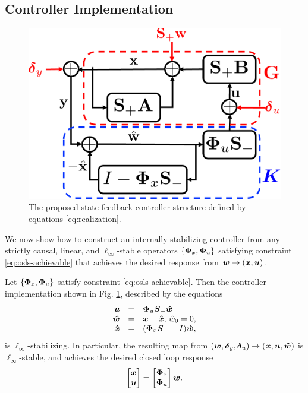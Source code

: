 \subsection{Controller Implementation}
\begin{figure}
\centering
\includegraphics[width=.35\textwidth]{interconnect}
\caption{The proposed state-feedback controller structure defined by equations \eqref{eq:realization}.}
\label{fig:realization}
\end{figure}
We now show how to construct an internally stabilizing controller from any strictly causal, linear, and $\ell_\infty$-stable operators $\left \{\boldsymbol{\Phi}_x,\boldsymbol{\Phi}_u\right\}$ satisfying constraint \eqref{eq:osls-achievable} that achieves the desired response from $\boldsymbol{w} \to (\boldsymbol{x}, \boldsymbol{u})$.
\begin{proposition}\label{prop:sufficiency}
Let $\left\{\boldsymbol{\Phi}_x,\boldsymbol{\Phi}_u\right\}$ satisfy constraint \eqref{eq:osls-achievable}.  Then the controller implementation shown in Fig. \ref{fig:realization}, described by the equations
\begin{equation}
\begin{array}{rcl}
\boldsymbol{u} &=& \boldsymbol{\Phi}_u \boldsymbol{S}_- \boldsymbol{\hat w}\\
\boldsymbol{\hat w} & = & \boldsymbol{x} - \boldsymbol{\hat x}, \, \hat{w}_0 = 0, \\
\boldsymbol{\hat x} &=& (\boldsymbol{\Phi}_x\boldsymbol{S}_--I)\boldsymbol{\hat w},
\end{array}
\label{eq:realization}
\end{equation}
is $\ell_\infty$-stabilizing.  In particular, the resulting map from $(\boldsymbol{w}, \boldsymbol{\delta}_y, \boldsymbol{\delta}_u) \to (\boldsymbol{x}, \boldsymbol{u}, \boldsymbol{\hat w})$ is $\ell_\infty$-stable, and achieves the desired closed loop response
\begin{equation}
\begin{bmatrix} \boldsymbol{x} \\ \boldsymbol{u} \end{bmatrix} = \begin{bmatrix} \boldsymbol{\Phi}_x \\ \boldsymbol{\Phi}_u \end{bmatrix}\boldsymbol{w}.
\label{eq:response}
\end{equation}
\end{proposition}
